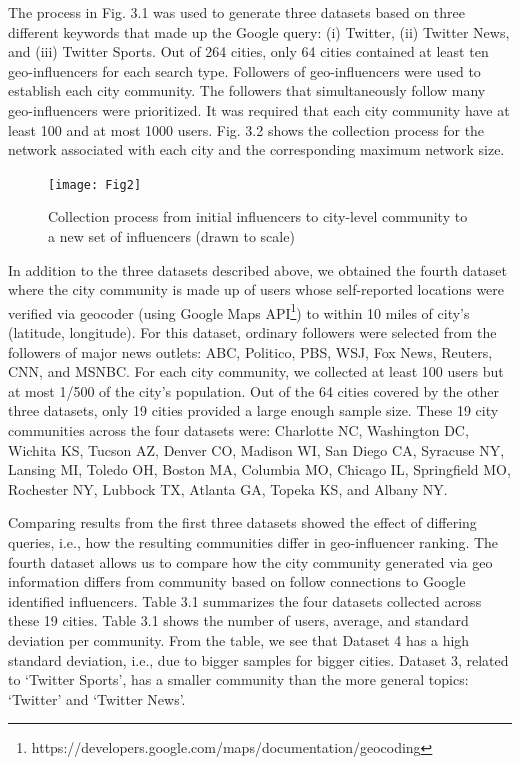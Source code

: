 The process in Fig. 3.1 was used to generate three datasets based on three different keywords that made up the Google query: (i) Twitter, (ii) Twitter News, and (iii) Twitter Sports. Out of 264 cities, only 64 cities contained at least ten geo-influencers for each search type. Followers of geo-influencers were used to establish each city community. The followers that simultaneously follow many geo-influencers were prioritized. It was required that each city community have at least 100 and at most 1000 users. Fig. 3.2 shows the collection process for the network associated with each city and the corresponding maximum network size.

\begin{figure}[!t]
\centering
\texttt{[image: Fig2]}
\caption[Collection from seed, to city-community, to set of influencers]{Collection process from initial influencers to city-level community to a new set of influencers (drawn to scale)}
\label{fig_ch3_2}
\end{figure}

In addition to the three datasets described above, we obtained the fourth dataset where the city community is made up of users whose self-reported locations were verified via geocoder (using Google Maps API\footnote{https://developers.google.com/maps/documentation/geocoding}) to within 10 miles of city's (latitude, longitude). For this dataset, ordinary followers were selected from the followers of major news outlets: ABC, Politico, PBS, WSJ, Fox News, Reuters, CNN, and MSNBC. For each city community, we collected at least 100 users but at most 1/500 of the city's population. Out of the 64 cities covered by the other three datasets, only 19 cities provided a large enough sample size. These 19 city communities across the four datasets were: Charlotte NC, Washington DC, Wichita KS, Tucson AZ, Denver CO, Madison WI, San Diego CA, Syracuse NY, Lansing MI, Toledo OH, Boston MA, Columbia MO, Chicago IL, Springfield MO, Rochester NY, Lubbock TX, Atlanta GA, Topeka KS, and Albany NY.

Comparing results from the first three datasets showed the effect of differing queries, i.e., how the resulting communities differ in geo-influencer ranking. The fourth dataset allows us to compare how the city community generated via geo information differs from community based on follow connections to Google identified influencers. Table 3.1 summarizes the four datasets collected across these 19 cities. Table 3.1 shows the number of users, average, and standard deviation per community. From the table, we see that Dataset 4 has a high standard deviation, i.e., due to bigger samples for bigger cities. Dataset 3, related to `Twitter Sports', has a smaller community than the more general topics: `Twitter' and `Twitter News'.

